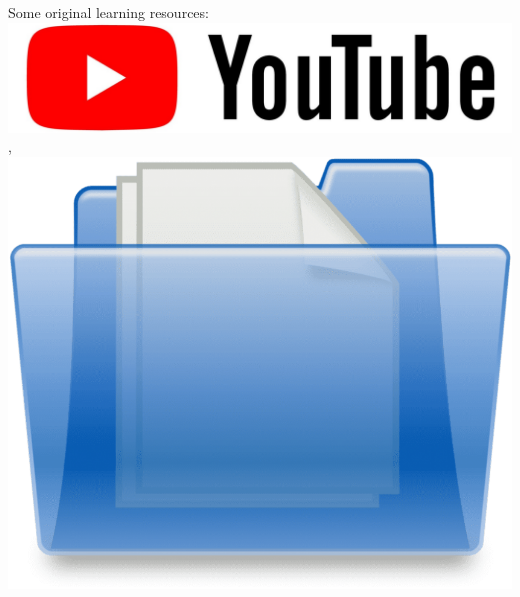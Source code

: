 \begin{zitemize}
\item Some original learning resources: \href{https://youtube.com/@gervasiojj?si=rgT2OySzyoKvKuKf}{\includegraphics[scale=0.025]{youtube.jpg}}, \href{https://drive.google.com/drive/folders/1JRLtP1kGEmH1EG_l8BVq4oRaHBvnXLOU?usp=sharing}{\includegraphics[scale=0.01]{folder.png}}
\end{zitemize}

